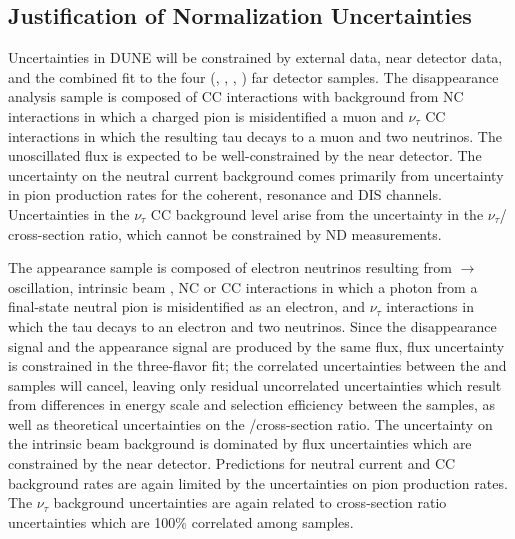 \subsection{Justification of Normalization Uncertainties}
\label{sec:syst_just}
Uncertainties in DUNE will be constrained by external data, near detector data, and the combined
fit to the four (\nue, \anue, \numu, \anumu) far detector samples.
The \numu disappearance analysis sample is composed of \numu CC interactions with background from NC
interactions in which a charged pion is misidentified a muon and $\nu_{\tau}$ CC interactions in which the resulting
tau decays to a muon and two neutrinos.
The unoscillated \numu flux is expected to be well-constrained by the near detector.
The uncertainty on the neutral current background comes primarily from uncertainty in pion production rates
for the coherent, resonance and DIS channels.
Uncertainties in the $\nu_{\tau}$ CC background level arise from the uncertainty in the $\nu_{\tau}$/\numu
cross-section ratio, which cannot be constrained by ND measurements.

The \nue appearance sample is composed of electron neutrinos resulting from \numu$\rightarrow$\nue oscillation,
intrinsic beam \nue, NC or \numu CC interactions in which a photon from a final-state neutral pion is
misidentified as an electron, and $\nu_{\tau}$ interactions in which the tau decays to an electron and
two neutrinos. Since the
\numu disappearance signal and the \nue appearance signal are produced by the same flux, flux uncertainty is
constrained in the three-flavor fit;
the correlated uncertainties between the \nue and \numu samples will cancel, leaving only residual uncorrelated
uncertainties which result from differences in energy scale and selection efficiency between the samples,
as well as theoretical uncertainties on the \nue/\numu cross-section ratio. The uncertainty on the intrinsic
beam \nue background is dominated by flux uncertainties which are constrained by the near detector.
Predictions for neutral current and \numu CC background rates are again limited by the uncertainties on pion
production rates.
The $\nu_{\tau}$ background uncertainties are again related to cross-section ratio uncertainties
which are 100\% correlated among samples.

